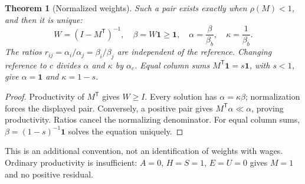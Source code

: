 \documentclass[11pt,a4paper]{article}
\newtheorem{theorem}{Theorem}[section]
\begin{document}
\begin{theorem}[Normalized weights]
Such a pair exists exactly when $\rho(M)<1$, and then it is unique:
\begin{equation}
W=(I-M^{\mathsf T})^{-1},\quad\beta=W\mathbf1\geq\mathbf1,\quad
\alpha=\frac{\beta}{\beta_b},\quad\kappa=\frac1{\beta_b}.
\end{equation}
The ratios $r_{ij}=\alpha_i/\alpha_j=\beta_i/\beta_j$ are independent of the reference. Changing reference to $c$ divides $\alpha$ and $\kappa$ by $\alpha_c$. Equal column sums $M^{\mathsf T}\mathbf1=s\mathbf1$, with $s<1$, give $\alpha=\mathbf1$ and $\kappa=1-s$.
\end{theorem}
\begin{proof}
Productivity of $M^{\mathsf T}$ gives $W\geq I$. Every solution has $\alpha=\kappa\beta$; normalization forces the displayed pair. Conversely, a positive pair gives $M^{\mathsf T}\alpha\ll\alpha$, proving productivity. Ratios cancel the normalizing denominator. For equal column sums, $\beta=(1-s)^{-1}\mathbf1$ solves the equation uniquely.
\end{proof}

This is an additional convention, not an identification of weights with wages. Ordinary productivity is insufficient: $A=0$, $H=S=1$, $E=U=0$ gives $M=1$ and no positive residual.
\end{document}
